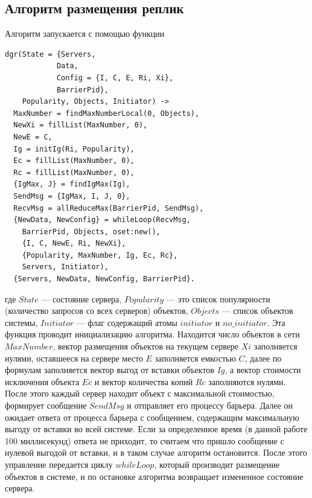 		\subsection{Алгоритм размещения реплик}
			Алгоритм запускается с помощью функции 
			\begin{lstlisting}
dgr(State = {Servers,
            Data, 
            Config = {I, C, E, Ri, Xi}, 
            BarrierPid}, 
    Popularity, Objects, Initiator) ->
  MaxNumber = findMaxNumberLocal(0, Objects),
  NewXi = fillList(MaxNumber, 0),
  NewE = C,
  Ig = initIg(Ri, Popularity),
  Ec = fillList(MaxNumber, 0),
  Rc = fillList(MaxNumber, 0),
  {IgMax, J} = findIgMax(Ig),
  SendMsg = {IgMax, I, J, 0},
  RecvMsg = allReduceMax(BarrierPid, SendMsg),
  {NewData, NewConfig} = whileLoop(RecvMsg, 
    BarrierPid, Objects, oset:new(),
    {I, C, NewE, Ri, NewXi}, 
    {Popularity, MaxNumber, Ig, Ec, Rc}, 
    Servers, Initiator),
  {Servers, NewData, NewConfig, BarrierPid}.
			\end{lstlisting}
			где $State$ --- состояние сервера, $Popularity$ --- это список популярности (количество запросов со всех серверов) объектов, $Objects$ --- список объектов системы, $Initiator$
			--- флаг содержащий атомы $initiator$ и $no\_initiator$. Эта функция проводит инициализацию алгоритма. Находится число объектов в сети $MaxNumber$, вектор размещения объектов на
			текущем сервере $Xi$ заполняется нулями, оставшееся на сервере место $E$ заполняется емкостью $C$, далее по формулам заполняется вектор выгод от вставки объектов $Ig$, а вектор
			стоимости исключения объекта $Ec$ и вектор количества копий $Rc$ заполняются нулями. После этого каждый сервер находит объект с максимальной стоимостью, формирует сообщение $SendMsg$ и отправляет 
			его процессу барьера. Далее он ожидает ответа от процесса барьера с сообщением, содержащим максимальную выгоду от вставки во всей системе. Если за определенное время (в данной
			работе 100 миллисекунд) ответа не приходит, то считаем что пришло сообщение с нулевой выгодой от вставки, и в таком случае алгоритм остановится. После этого управление передается 
			циклу $whileLoop$, который производит размещение объектов в системе, и по остановке алгоритма возвращает измененное состояние сервера. 
